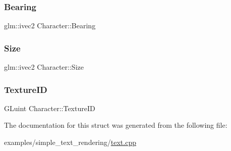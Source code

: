 \subsubsection{\texorpdfstring{Bearing}{Bearing}}
{\footnotesize\ttfamily glm\+::ivec2 Character\+::\+Bearing}

\mbox{\label{structCharacter_aaaa598050e0ef590fe6903fd2bab40b8}} 
\subsubsection{\texorpdfstring{Size}{Size}}
{\footnotesize\ttfamily glm\+::ivec2 Character\+::\+Size}

\mbox{\label{structCharacter_a51d894cc31d79e95fe1a47fb65c6e889}} 
\subsubsection{\texorpdfstring{Texture\+ID}{TextureID}}
{\footnotesize\ttfamily G\+Luint Character\+::\+Texture\+ID}



The documentation for this struct was generated from the following file\+:\begin{DoxyCompactItemize}
\item 
examples/simple\+\_\+text\+\_\+rendering/\mbox{\hyperlink{text_8cpp}{text.\+cpp}}\end{DoxyCompactItemize}

